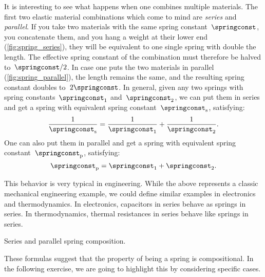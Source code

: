     It is interesting to see what happens when one combines multiple materials.
    The first two elastic material combinations which come to mind are \emph{series} and \emph{parallel}.
    If you take two materials with the same spring constant~$\springconst$, you concatenate them, and you hang a weight at their lower end (\cref{fig:spring_series}), they will be equivalent to one single spring with double the length.
    The effective spring constant of the combination must therefore be halved to~$\springconst/2$.
    In case one puts the two materials in parallel (\cref{fig:spring_parallel}), the length remains the same, and the resulting spring constant doubles to~$2\springconst$.
    In general, given any two springs with spring constants~$\springconst_1$ and~$\springconst_2$, we can put them in series and get a spring with equivalent spring constant~$\springconst_{\mathrm{s}}$, satisfying:
    \begin{equation}
        \frac{1}{\springconst_\mathrm{s}}=\frac{1}{\springconst_1}+\frac{1}{\springconst_2}.
    \end{equation}
    One can also put them in parallel and get a spring with equivalent spring constant~$\springconst_\mathrm{p}$, satisfying:
\begin{equation}
    \springconst_\mathrm{p}=\springconst_1+\springconst_2.
\end{equation}

\begin{remark}
    This behavior is very typical in engineering.
    While the above represents a classic mechanical engineering example, we could define similar examples in electronics and thermodynamics.
    In electronics, capacitors in series behave as springs in series.
    In thermodynamics, thermal resistances in series behave like springs in series.
\end{remark}

\begin{marginfigure}
    \centering
    \hspace{1cm}
    \caption{Series and parallel spring composition.}
    \label{fig:springs}
\end{marginfigure}

These formulas suggest that the property of being a spring is compositional.
In the following exercise, we are going to highlight this by considering specific cases.

